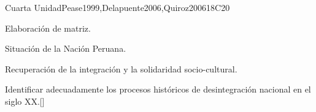 \begin{syllabus}
\begin{unit}{}{Cuarta Unidad}{Pease1999,Delapuente2006,Quiroz2006}{18}{C20}
\begin{topics}
\begin{subtopics}
	    \item Elaboración de matriz.
	  \end{subtopics}
    \item Situación de la Nación Peruana.
    \item Recuperación de la integración y la solidaridad socio-cultural.
\end{topics}
\begin{learningoutcomes}
	\item Identificar adecuadamente los procesos históricos de desintegración nacional en el siglo XX.[\Familiarity]
\end{learningoutcomes}
\end{unit}

\begin{coursebibliography}
\end{coursebibliography}

\end{syllabus}
